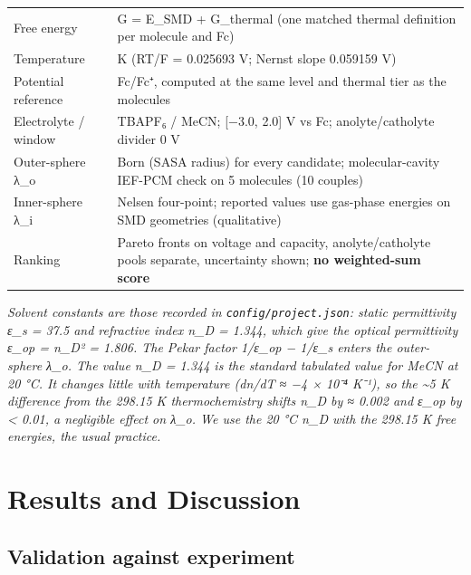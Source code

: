 \documentclass[journal=jcisd8,manuscript=article]{achemso}
\begin{document}
\begin{table}[htbp]
\begin{tabularx}{\textwidth}{@{}>{\raggedright\arraybackslash}X>{\raggedright\arraybackslash}X@{}}
Free energy & G = E\_\allowbreak{}SMD + G\_\allowbreak{}thermal (one matched thermal definition per molecule and Fc) \\
Temperature & 298.15 K (RT/F = 0.025693 V; Nernst slope 0.059159 V) \\
Potential reference & Fc/Fc⁺, computed at the same level and thermal tier as the molecules \\
Electrolyte / window & TBAPF₆ / MeCN; [−3.0, 2.0] V vs Fc; anolyte/catholyte divider 0 V \\
Outer-\allowbreak{}sphere λ\_\allowbreak{}o & Born (SASA radius) for every candidate; molecular-\allowbreak{}cavity IEF-\allowbreak{}PCM check on 5 molecules (10 couples) \\
Inner-\allowbreak{}sphere λ\_\allowbreak{}i & Nelsen four-\allowbreak{}point; reported values use gas-\allowbreak{}phase energies on SMD geometries (qualitative) \\
Ranking & Pareto fronts on voltage and capacity, anolyte/catholyte pools separate, uncertainty shown; \textbf{no weighted-\allowbreak{}sum score} \\
\hline
\end{tabularx}
\end{table}

\emph{Solvent constants are those recorded in \texttt{config/project.json}: static permittivity ε\_s = 37.5 and refractive index n\_D = 1.344, which give the optical permittivity ε\_op = n\_D² = 1.806. The Pekar factor 1/ε\_op − 1/ε\_s enters the outer-sphere λ\_o. The value n\_D = 1.344 is the standard tabulated value for MeCN at 20 °C. It changes little with temperature (dn/dT ≈ −4 × 10⁻⁴ K⁻¹), so the \textasciitilde{}5 K difference from the 298.15 K thermochemistry shifts n\_D by ≈ 0.002 and ε\_op by < 0.01, a negligible effect on λ\_o. We use the 20 °C n\_D with the 298.15 K free energies, the usual practice.}

\section{Results and Discussion}

\subsection{Validation against experiment}
\end{document}
